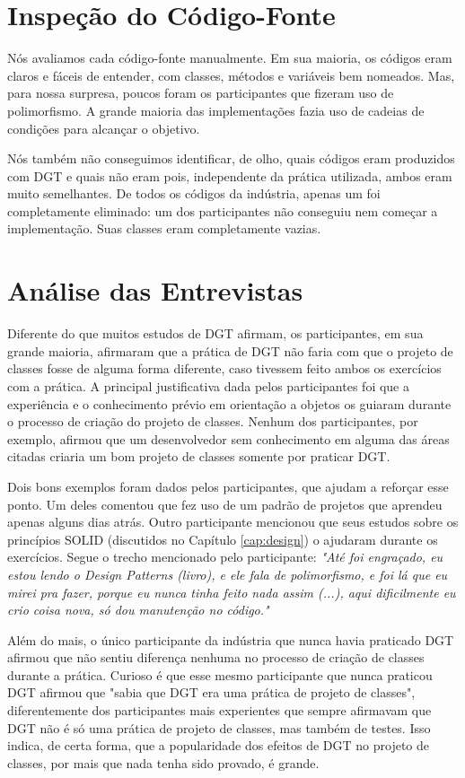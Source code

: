 \section{Inspeção do Código-Fonte}

Nós avaliamos cada código-fonte manualmente.
Em sua maioria, os códigos eram claros e fáceis de entender,
com classes, métodos e variáveis bem nomeados.
Mas, para nossa surpresa,
poucos foram os participantes que fizeram uso de polimorfismo. A grande
maioria das implementações fazia uso de cadeias de condições para 
alcançar o objetivo.

Nós também não conseguimos identificar, de olho, quais códigos
eram produzidos com DGT e quais não eram pois, independente
da prática utilizada, ambos eram muito semelhantes.
De todos os códigos da indústria, apenas um foi completamente eliminado:
um dos participantes não conseguiu nem começar a implementação. Suas classes
eram completamente vazias. 

\section{Análise das Entrevistas}

Diferente do que muitos estudos de DGT afirmam, os participantes, em sua grande maioria, afirmaram que 
a prática de DGT não faria com que o projeto de classes fosse de alguma forma diferente, caso tivessem
feito ambos os exercícios com a prática.
A principal justificativa dada pelos participantes foi que a experiência e o conhecimento prévio
em orientação a objetos os guiaram durante o processo de criação do projeto de classes. Nenhum dos
participantes, por exemplo, afirmou que um desenvolvedor sem conhecimento em alguma das áreas
citadas criaria um bom projeto de classes somente por praticar DGT.

Dois bons exemplos foram dados pelos participantes, que ajudam a reforçar esse ponto. Um deles
comentou que fez uso de um padrão de projetos \cite{gof} que aprendeu apenas alguns dias atrás.
Outro participante mencionou que seus estudos sobre os princípios SOLID (discutidos no Capítulo \ref{cap:design})
o ajudaram durante os exercícios. Segue o trecho mencionado pelo participante:
\textit{"Até foi engraçado, eu estou lendo o Design Patterns (livro), e ele fala de polimorfismo, e foi
lá que eu mirei pra fazer, porque eu nunca tinha feito nada assim (...), aqui dificilmente eu crio
coisa nova, só dou manutenção no código."}

Além do mais, o único participante da indústria que nunca havia
praticado DGT afirmou que não sentiu diferença nenhuma no processo de criação de classes durante
a prática.
Curioso é que esse mesmo participante que nunca praticou DGT afirmou que "sabia que DGT era uma prática de projeto de classes",
diferentemente dos participantes mais experientes que sempre afirmavam que DGT não é só uma prática de projeto de classes,
mas também de testes. Isso indica, de certa forma, que a popularidade dos efeitos de DGT no projeto de classes, por mais
que nada tenha sido provado, é grande.

